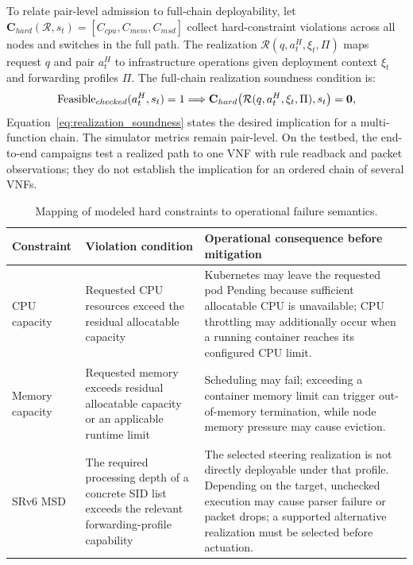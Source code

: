 \documentclass[final,5p]{elsarticle}
\newcommand{\rev}[1]{\textcolor{revisiongreen}{#1}}
\begin{document}
\rev{To relate pair-level admission to full-chain deployability, let $\mathbf{C}_{hard}(\mathcal{R},s_t)=[C_{cpu},C_{mem},C_{msd}]$ collect hard-constraint violations across all nodes and switches in the full path. The realization $\mathcal{R}(q,a_t^H,\xi_t,\Pi)$ maps request $q$ and pair $a_t^H$ to infrastructure operations given deployment context $\xi_t$ and forwarding profiles $\Pi$. The full-chain realization soundness condition is:}
\begin{equation}
    \rev{\mathrm{Feasible}_{checked}(a_t^H,s_t)=1\Longrightarrow\mathbf{C}_{hard}\!\left(\mathcal{R}(q,a_t^H,\xi_t,\Pi),s_t\right)=\mathbf{0},}
\label{eq:realization_soundness}
\end{equation}
\rev{Equation~\eqref{eq:realization_soundness} states the desired implication for a multi-function chain. The simulator metrics remain pair-level. On the testbed, the end-to-end campaigns test a realized path to one VNF with rule readback and packet observations; they do not establish the implication for an ordered chain of several VNFs.}

\begin{table}[!tb]
\centering
\caption{\rev{Mapping of modeled hard constraints to operational failure semantics.}}
\label{tab:hard_constraint_failure_mapping}
\renewcommand{\arraystretch}{1.15}
\small
\begin{tabularx}{\textwidth}{p{2.6cm}p{4.0cm}X}
\toprule
\rev{\textbf{Constraint}} & \rev{\textbf{Violation condition}} & \rev{\textbf{Operational consequence before mitigation}} \\
\midrule
\rev{CPU capacity} & \rev{Requested CPU resources exceed the residual allocatable capacity} & \rev{Kubernetes may leave the requested pod Pending because sufficient allocatable CPU is unavailable; CPU throttling may additionally occur when a running container reaches its configured CPU limit.} \\
\rev{Memory capacity} & \rev{Requested memory exceeds residual allocatable capacity or an applicable runtime limit} & \rev{Scheduling may fail; exceeding a container memory limit can trigger out-of-memory termination, while node memory pressure may cause eviction.} \\
\rev{SRv6 MSD} & \rev{The required processing depth of a concrete SID list exceeds the relevant forwarding-profile capability} & \rev{The selected steering realization is not directly deployable under that profile. Depending on the target, unchecked execution may cause parser failure or packet drops; a supported alternative realization must be selected before actuation.} \\
\bottomrule
\end{tabularx}
\end{table}
\end{document}
